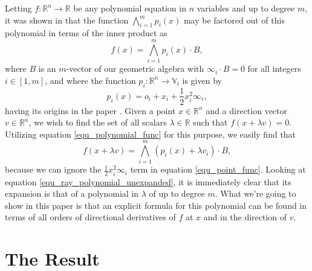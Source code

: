 \documentclass{birkjour}
\theoremstyle{definition}
\theoremstyle{remark}
\numberwithin{equation}{section}
\newcommand{\R}{\mathbb{R}}
\newcommand{\V}{\mathbb{V}}
\newcommand{\nvai}{\infty}
\newcommand{\nvao}{o}
\begin{document}
Letting $f:\R^n\to\R$ be any polynomial equation in $n$ variables and up to degree $m$, it
was shown in \cite{Parkin13} that the function $\bigwedge_{i=1}^m p_i(x)$ may be factored out
of this polynomial in terms of the inner product as
\begin{equation}\label{equ_polynomial_func}
f(x) = \bigwedge_{i=1}^m p_i(x)\cdot B,
\end{equation}
where $B$ is an $m$-vector of our geometric algebra with $\nvai_i\cdot B=0$ for all
integers $i\in[1,m]$, and where the function
$p_i:\R^n\to\V_i$ is given by
\begin{equation}\label{equ_point_func}
p_i(x) = \nvao_i + x_i + \frac{1}{2}x_i^2\nvai_i,
\end{equation}
having its origins in the paper \cite{Hestenes01}.
Given a point $x\in\R^n$ and a direction vector $v\in\R^n$,
we wish to find the set of all scalars $\lambda\in\R$ such that $f(x+\lambda v)=0$.
Utilizing equation \eqref{equ_polynomial_func} for this purpose, we easily find that
\begin{equation}\label{equ_ray_polynomial_unexpanded}
f(x+\lambda v) = \bigwedge_{i=1}^m(p_i(x)+\lambda v_i)\cdot B,
\end{equation}
because we can ignore the $\frac{1}{2}x_i^2\nvai_i$ term in equation \eqref{equ_point_func}.
Looking at equation \eqref{equ_ray_polynomial_unexpanded},
it is immediately clear that its expansion is that of a polynomial in $\lambda$ of up to degree $m$.
What we're going to show in this paper is that an explicit formula for this polynomial can
be found in terms of all orders of directional derivatives of $f$ at $x$ and in the
direction of $v$.

\section{The Result}
\end{document}
